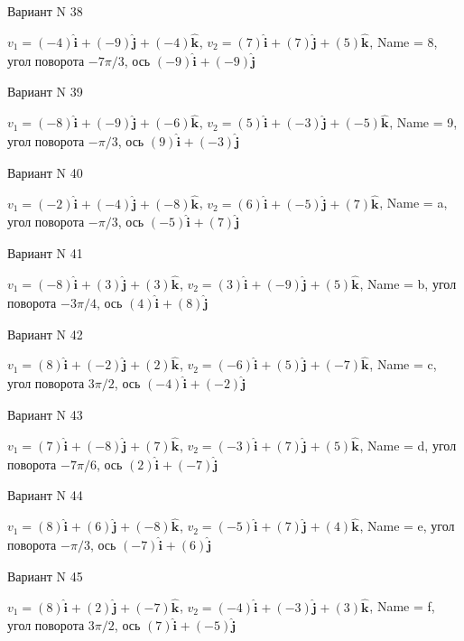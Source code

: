 \documentclass[11pt]{report}
\begin{document}
Вариант N 38

$v_1 = (-4)\mathbf{\hat{i}_{}} + (-9)\mathbf{\hat{j}_{}} + (-4)\mathbf{\hat{k}_{}}$, $v_2 = (7)\mathbf{\hat{i}_{}} + (7)\mathbf{\hat{j}_{}} + (5)\mathbf{\hat{k}_{}}$, Name = 8, угол поворота $- 7 \pi / 3$, ось $(-9)\mathbf{\hat{i}_{}} + (-9)\mathbf{\hat{j}_{}}$

Вариант N 39

$v_1 = (-8)\mathbf{\hat{i}_{}} + (-9)\mathbf{\hat{j}_{}} + (-6)\mathbf{\hat{k}_{}}$, $v_2 = (5)\mathbf{\hat{i}_{}} + (-3)\mathbf{\hat{j}_{}} + (-5)\mathbf{\hat{k}_{}}$, Name = 9, угол поворота $- \pi / 3$, ось $(9)\mathbf{\hat{i}_{}} + (-3)\mathbf{\hat{j}_{}}$

Вариант N 40

$v_1 = (-2)\mathbf{\hat{i}_{}} + (-4)\mathbf{\hat{j}_{}} + (-8)\mathbf{\hat{k}_{}}$, $v_2 = (6)\mathbf{\hat{i}_{}} + (-5)\mathbf{\hat{j}_{}} + (7)\mathbf{\hat{k}_{}}$, Name = a, угол поворота $- \pi / 3$, ось $(-5)\mathbf{\hat{i}_{}} + (7)\mathbf{\hat{j}_{}}$

Вариант N 41

$v_1 = (-8)\mathbf{\hat{i}_{}} + (3)\mathbf{\hat{j}_{}} + (3)\mathbf{\hat{k}_{}}$, $v_2 = (3)\mathbf{\hat{i}_{}} + (-9)\mathbf{\hat{j}_{}} + (5)\mathbf{\hat{k}_{}}$, Name = b, угол поворота $- 3 \pi / 4$, ось $(4)\mathbf{\hat{i}_{}} + (8)\mathbf{\hat{j}_{}}$

Вариант N 42

$v_1 = (8)\mathbf{\hat{i}_{}} + (-2)\mathbf{\hat{j}_{}} + (2)\mathbf{\hat{k}_{}}$, $v_2 = (-6)\mathbf{\hat{i}_{}} + (5)\mathbf{\hat{j}_{}} + (-7)\mathbf{\hat{k}_{}}$, Name = c, угол поворота $3 \pi / 2$, ось $(-4)\mathbf{\hat{i}_{}} + (-2)\mathbf{\hat{j}_{}}$

Вариант N 43

$v_1 = (7)\mathbf{\hat{i}_{}} + (-8)\mathbf{\hat{j}_{}} + (7)\mathbf{\hat{k}_{}}$, $v_2 = (-3)\mathbf{\hat{i}_{}} + (7)\mathbf{\hat{j}_{}} + (5)\mathbf{\hat{k}_{}}$, Name = d, угол поворота $- 7 \pi / 6$, ось $(2)\mathbf{\hat{i}_{}} + (-7)\mathbf{\hat{j}_{}}$

Вариант N 44

$v_1 = (8)\mathbf{\hat{i}_{}} + (6)\mathbf{\hat{j}_{}} + (-8)\mathbf{\hat{k}_{}}$, $v_2 = (-5)\mathbf{\hat{i}_{}} + (7)\mathbf{\hat{j}_{}} + (4)\mathbf{\hat{k}_{}}$, Name = e, угол поворота $- \pi / 3$, ось $(-7)\mathbf{\hat{i}_{}} + (6)\mathbf{\hat{j}_{}}$

Вариант N 45

$v_1 = (8)\mathbf{\hat{i}_{}} + (2)\mathbf{\hat{j}_{}} + (-7)\mathbf{\hat{k}_{}}$, $v_2 = (-4)\mathbf{\hat{i}_{}} + (-3)\mathbf{\hat{j}_{}} + (3)\mathbf{\hat{k}_{}}$, Name = f, угол поворота $3 \pi / 2$, ось $(7)\mathbf{\hat{i}_{}} + (-5)\mathbf{\hat{j}_{}}$
\end{document}
